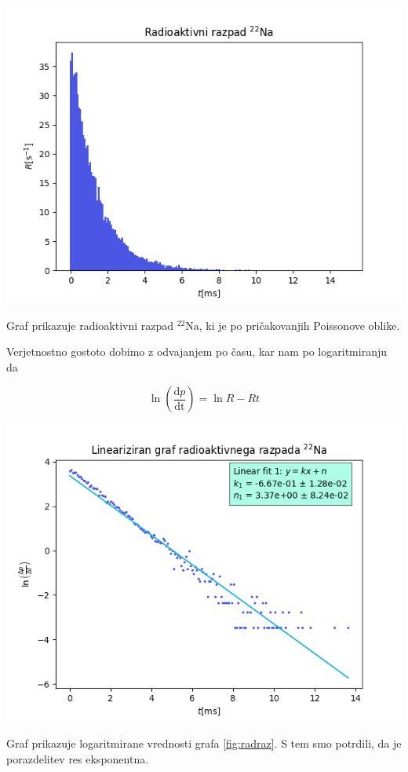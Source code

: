 \documentclass[11pt]{article}
\begin{document}
\begin{slika}[H]
  \centering
  \includegraphics[width=.9\linewidth]{figures/radio_razpad.png}
  \caption{\small Graf prikazuje radioaktivni razpad $^{22} \mathrm{Na}$, ki je po pričakovanjih Poissonove oblike.}\label{fig:radraz}
\end{slika}

Verjetnostno gostoto dobimo z odvajanjem po času, kar nam po logaritmiranju da

\begin{equation}
\label{eq:2}
\ln \left( \frac{\mathrm{d} p}{\mathrm{dt}} \right) = \ln R - Rt
\end{equation}

\begin{slika}[H]
  \centering
  \includegraphics[width=.9\linewidth]{figures/log_radio_razpad.png}
  \caption{\small Graf prikazuje logaritmirane vrednosti grafa \ref{fig:radraz}. S tem smo potrdili, da je porazdelitev res eksponentna.}\label{fig:logradraz}
\end{slika}
\end{document}
